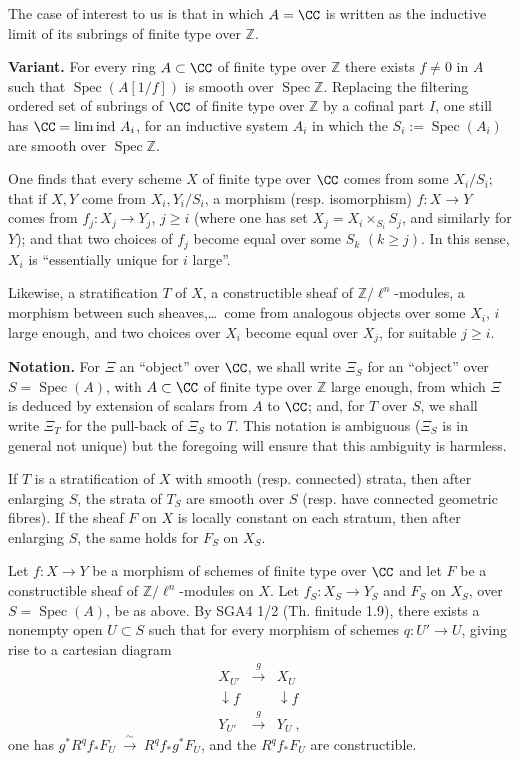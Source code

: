 \documentclass[12pt,oneside]{amsbook}
\theoremstyle{plain}
\theoremstyle{definition}
\newcommand{\ZZ}{\mathbb{Z}}  \newcommand{\QQ}{\mathbb{Q}}
\DeclareMathOperator{\Spec}{Spec}
\newcommand{\isoto}{\xrightarrow{\ \sim\ }}
\begin{document}
\smallskip
The case of interest to us is that in which $A = \CC$ is written as the inductive limit of its subrings of finite type over $\ZZ$.

\smallskip
\textbf{Variant.} For every ring $A\subset\CC$ of finite type over $\ZZ$ there exists $f\neq 0$ in $A$ such that $\Spec(A[1/f])$ is smooth over $\Spec\ZZ$. Replacing the filtering ordered set of subrings of $\CC$ of finite type over $\ZZ$ by a cofinal part $I$, one still has $\CC = \lim\mathrm{ind}\ A_{i}$, for an inductive system $A_{i}$ in which the $S_{i} := \Spec(A_{i})$ are smooth over $\Spec\ZZ$.

One finds that every scheme $X$ of finite type over $\CC$ comes from some $X_{i}/S_{i}$; that if $X,Y$ come from $X_{i},Y_{i}/S_{i}$, a morphism (resp. isomorphism) $f : X\to Y$ comes from $f_{j} : X_{j}\to Y_{j}$, $j\ge i$ (where one has set $X_{j} = X_{i}\times_{S_{i}}S_{j}$, and similarly for $Y$); and that two choices of $f_{j}$ become equal over some $S_{k}$ $(k\ge j)$. In this sense, $X_{i}$ is ``essentially unique for $i$ large''.

\smallskip
Likewise, a stratification $T$ of $X$, a constructible sheaf of $\ZZ/\ell^{n}$-modules, a morphism between such sheaves,\dots\ come from analogous objects over some $X_{i}$, $i$ large enough, and two choices over $X_{i}$ become equal over $X_{j}$, for suitable $j\ge i$.

\smallskip
\textbf{Notation.} For $\Xi$ an ``object'' over $\CC$, we shall write $\Xi_{S}$ for an ``object'' over $S=\Spec(A)$, with $A\subset\CC$ of finite type over $\ZZ$ large enough, from which $\Xi$ is deduced by extension of scalars from $A$ to $\CC$; and, for $T$ over $S$, we shall write $\Xi_{T}$ for the pull-back of $\Xi_{S}$ to $T$. This notation is ambiguous ($\Xi_{S}$ is in general not unique) but the foregoing will ensure that this ambiguity is harmless.

\smallskip
If $T$ is a stratification of $X$ with smooth (resp. connected) strata, then after enlarging $S$, the strata of $T_{S}$ are smooth over $S$ (resp. have connected geometric fibres). If the sheaf $F$ on $X$ is locally constant on each stratum, then after enlarging $S$, the same holds for $F_{S}$ on $X_{S}$.

\smallskip
Let $f : X\to Y$ be a morphism of schemes of finite type over $\CC$ and let $F$ be a constructible sheaf of $\ZZ/\ell^{n}$-modules on $X$. Let $f_{S} : X_{S}\to Y_{S}$ and $F_{S}$ on $X_{S}$, over $S=\Spec(A)$, be as above. By SGA4 1/2 (Th. finitude 1.9), there exists a nonempty open $U\subset S$ such that for every morphism of schemes $q : U'\to U$, giving rise to a cartesian diagram
\[
\begin{array}{ccc}
X_{U'} & \xrightarrow{\ \ g\ \ } & X_{U}\\[2pt]
\downarrow{\scriptstyle f} & & \downarrow{\scriptstyle f}\\[2pt]
Y_{U'} & \xrightarrow{\ \ g\ \ } & Y_{U}\ ,
\end{array}
\]
one has $g^{*}R^{q}f_{*}F_{U}\ \isoto\ R^{q}f_{*}g^{*}F_{U}$, and the $R^{q}f_{*}F_{U}$ are constructible.
\end{document}
